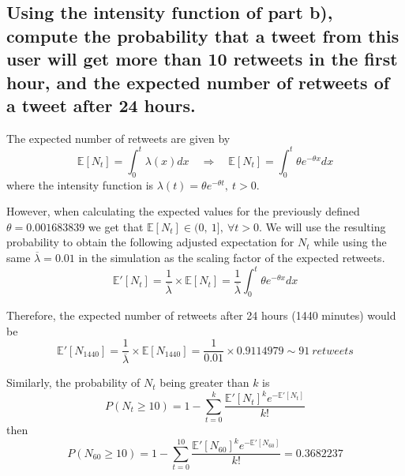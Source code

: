 \subsection{Using the intensity function of part b), compute the probability that a tweet from this user will get more than 10 retweets in the first hour, and the expected number of retweets of a tweet after 24 hours.}

The expected number of retweets are given by 
\[\mathbb{E}[N_t] = \int^t_0\lambda(x)dx \quad \Longrightarrow \quad \mathbb{E}[N_t] = \int^t_0 \theta e^{-\theta x} dx\]
where the intensity function is $ \lambda (t) = \theta e^{-\theta t},\ t>0$. 

However, when calculating the expected values for the previously defined $\theta = 0.001683839$ we get that $\mathbb{E}[N_t] \in (0,\ 1],\ \forall t>0$. We will use the resulting probability to obtain the following adjusted expectation for $N_t$ while using the same $\overline\lambda = 0.01$ in the simulation as the scaling factor of the expected retweets. 
\[\mathbb{E}'[N_t] = \frac{1}{\overline\lambda} \times \mathbb{E}[N_t] = \frac{1}{\overline\lambda}\int^t_0 \theta e^{-\theta x} dx\]

Therefore, the expected number of retweets after 24 hours (1440 minutes) would be
\[\mathbb{E}'[N_{1440}] = \frac{1}{\overline\lambda} \times \mathbb{E}[N_{1440}] = \frac{1}{0.01} \times 0.9114979 \sim 91\ retweets \] 

Similarly, the probability of $N_t$ being greater than $k$ is
\[P(N_{t} \geq 10) = 1 - \sum_{t=0}^{k}\frac{\mathbb{E}'[N_{t}]^k e^{-\mathbb{E}'[N_{t}]}}{k!}\]
then
\[P(N_{60} \geq 10) = 1 - \sum_{t=0}^{10}\frac{\mathbb{E}'[N_{60}]^k e^{-\mathbb{E}'[N_{60}]}}{k!} = 0.3682237\]